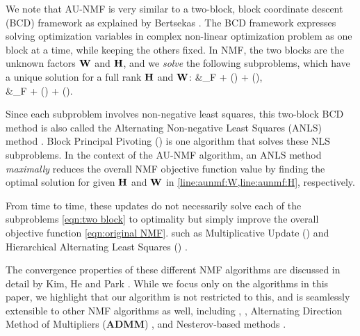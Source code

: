We note that AU-NMF is very similar to a two-block, block coordinate descent (BCD) framework as explained by Bertsekas \cite{bertsekas1999nonlinear}.
The BCD framework expresses solving optimization variables in complex non-linear optimization problem as one block at a time, while keeping the others fixed. In NMF,  the two blocks are
the unknown factors $\mathbf{W}$ and $\mathbf{H}$, 
and we \emph{solve} the following subproblems,
which have a unique solution for a full rank $\mathbf{H}$ and $\mathbf{W}$: 
\SplitN{\label{eqn:two block}} {
\WW &\leftarrow {}\NormBr{\AA-\tilde\WW\HH}_F +  \phi (\tilde \WW) + \psi (\HH),\\
\HH &\leftarrow  {}\NormBr{\AA-\WW\tilde\HH}_F + \phi (\WW) + \psi (\tilde \HH).
}

Since each subproblem involves non-negative least squares,
this two-block BCD method is also called
the Alternating Non-negative Least Squares (ANLS) method \cite{kim2013nonnegative}.
Block Principal Pivoting (\BPP) is one algorithm that solves these NLS subproblems.
In the context of the AU-NMF algorithm,
 an ANLS method {\em maximally} reduces 
the overall NMF objective function value 
by finding the optimal solution for
 given $\mathbf{H}$ and $\mathbf{W}$ in \cref{line:aunmf:W,line:aunmf:H}, respectively.  

From time to time, these updates do not necessarily solve each of the subproblems \eqref{eqn:two block} to optimality but simply improve the overall objective function \eqref{eqn:original NMF}.  
such as Multiplicative Update (\MU) \cite{seung2001algorithms} and Hierarchical Alternating Least Squares (\HALS) \cite{cichocki2009nonnegative}.

The convergence properties of these different NMF algorithms are discussed in detail by Kim, He and Park \cite{kim2013nonnegative}.
While we focus only on the \MU algorithms in this paper, we highlight that our algorithm is not restricted to this, and is seamlessly extensible to other NMF algorithms as well, including \HALS, \BPP, Alternating Direction Method of Multipliers (\textbf{ADMM}) \cite{SF14}, and Nesterov-based methods \cite{GTLY12}. 


